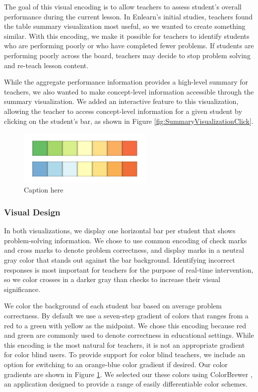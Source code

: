 \documentclass{sigchi}
\begin{document}
The goal of this visual encoding is to allow teachers to assess student's overall performance during the current lesson. In Enlearn's initial studies, teachers found the table summary visualization most useful, so we wanted to create something similar. With this encoding, we make it possible for teachers to identify students who are performing poorly or who have completed fewer problems. If students are performing poorly across the board, teachers may decide to stop problem solving and re-teach lesson content. 

While the aggregate performance information provides a high-level summary for teachers, we also wanted to make concept-level information accessible through the summary visualization. We added an interactive feature to this visualization, allowing the teacher to access concept-level information for a given student by clicking on the student's bar, as shown in Figure \ref{fig:SummaryVisualizationClick}.

\begin{figure}[t]
\centering
\includegraphics[width=65mm]{images/ColorGradients.pdf}
\caption{Caption here}
\label{fig:ColorGradients}
\end{figure}

\subsubsection{Visual Design}
In both visualizations, we display one horizontal bar per student that shows problem-solving information. We chose to use common encoding of check marks and cross marks to denote problem correctness, and display marks in a neutral gray color that stands out against the bar background. Identifying incorrect responses is most important for teachers for the purpose of real-time intervention, so we color crosses in a darker gray than checks to increase their visual significance.

We color the background of each student bar based on average problem correctness. By default we use a seven-step gradient of colors that ranges from a red to a  green with yellow as the midpoint. We chose this encoding because red and green are commonly used to denote correctness in educational settings. While this encoding is the most natural for teachers, it is not an appropriate gradient for color blind users. To provide support for color blind teachers, we include an option for switching to an orange-blue color gradient if desired. Our color gradients are shown in Figure \ref{fig:ColorGradients}. We selected our these colors using ColorBrewer \cite{ColorBrewer}, an application designed to provide a range of easily differentiable color schemes.
\end{document}
